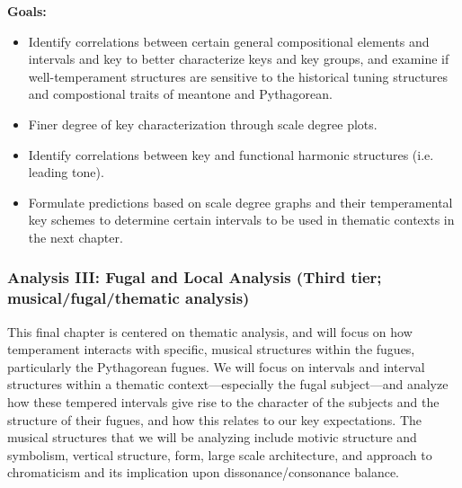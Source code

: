 \textbf{Goals:}

\begin{itemize}
\tightlist
\item
  Identify correlations between certain general compositional elements
  and intervals and key to better characterize keys and key groups, and
  examine if well-temperament structures are sensitive to the historical
  tuning structures and compostional traits of meantone and Pythagorean.
\item
  Finer degree of key characterization through scale degree plots.
\item
  Identify correlations between key and functional harmonic structures
  (i.e. leading tone).
\item
  Formulate predictions based on scale degree graphs and their
  temperamental key schemes to determine certain intervals to be used in
  thematic contexts in the next chapter.
\end{itemize}

\subsubsection{Analysis III: Fugal and Local Analysis (Third tier;
musical/fugal/thematic
analysis)}\label{analysis-iii-fugal-and-local-analysis-third-tier-musicalfugalthematic-analysis}

This final chapter is centered on thematic analysis, and will focus on
how temperament interacts with specific, musical structures within the
fugues, particularly the Pythagorean fugues. We will focus on intervals
and interval structures within a thematic context---especially the
fugal subject---and analyze how these tempered intervals give rise
to the character of the subjects and the structure of their fugues, and
how this relates to our key expectations. The musical structures that we
will be analyzing include motivic structure and symbolism, vertical
structure, form, large scale architecture, and approach to chromaticism
and its implication upon dissonance/consonance balance.

